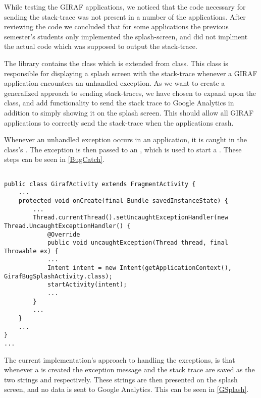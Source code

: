 
While testing the GIRAF applications, we noticed that the code necessary for
sending the stack-trace was not present in a number of the applications. After
reviewing the code we concluded that for some applications the previous
semester's students only implemented the splash-screen, and did not implment
the actual code which was supposed to output the stack-trace.\nl

The  library contains the
 class which is extended from 
class. This class is responsible for displaying a splash screen with the
stack-trace whenever a GIRAF application encounters an unhandled exception. As
we want to create a generalized approach to sending stack-traces, we have chosen
to expand upon the  class, and add functionality
to send the stack trace to Google Analytics in addition to simply showing it on
the splash screen. This should allow all GIRAF applications to correctly send
the stack-trace when the applications crash. \nl

Whenever an unhandled exception occurs in an application, it is caught in the
 class's . The exception is
then passed to an , which is used to start a
. These steps can be seen in
\autoref{BugCatch}.\nl


\begin{minipage}[H]{\linewidth}
\begin{lstlisting}[caption = Catching exceptions and starting creating a \textc{GirafBugSplashActivity}, label = BugCatch]

public class GirafActivity extends FragmentActivity {
	...
    protected void onCreate(final Bundle savedInstanceState) {
    	...
    	Thread.currentThread().setUncaughtExceptionHandler(new Thread.UncaughtExceptionHandler() {
            @Override
            public void uncaughtException(Thread thread, final Throwable ex) {
            ...
            Intent intent = new Intent(getApplicationContext(), GirafBugSplashActivity.class);
			startActivity(intent);
			...
		}
		...
	}
	...
}
...			
\end{lstlisting}
\end{minipage}

The current implementation's approach to handling the exceptions, is
that whenever a  is created the exception message
and the stack trace are saved as the two strings  and
 respectively. These strings are then presented on the splash
screen, and no data is sent to Google Analytics. This can be seen in
\autoref{GSplash}.\nl

